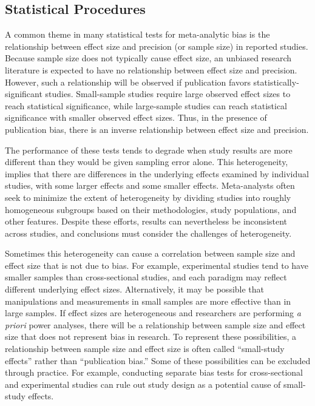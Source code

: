 \documentclass[man, mask]{apa6}
\begin{document}
\subsection{Statistical Procedures}
A common theme in many statistical tests for meta-analytic bias is the relationship between effect size and precision (or sample size) in reported studies. Because sample size does not typically cause effect size, an unbiased research literature is expected to have no relationship between effect size and precision. However, such a relationship will be observed if publication favors statistically-significant studies. Small-sample studies require large observed effect sizes to reach statistical significance, while large-sample studies can reach statistical significance with smaller observed effect sizes. Thus, in the presence of publication bias, there is an inverse relationship between effect size and precision. 

The performance of these tests tends to degrade when study results are more different than they would be given sampling error alone. This heterogeneity, implies that there are differences in the underlying effects examined by individual studies, with some larger effects and some smaller effects. Meta-analysts often seek to minimize the extent of heterogeneity by dividing studies into roughly homogeneous subgroups based on their methodologies, study populations, and other features. Despite these efforts, results can nevertheless be inconsistent across studies, and conclusions must consider the challenges of heterogeneity.

Sometimes this heterogeneity can cause a correlation between sample size and effect size that is not due to bias. For example, experimental studies tend to have smaller samples than cross-sectional studies, and each paradigm may reflect different underlying effect sizes. Alternatively, it may be possible that manipulations and measurements in small samples are more effective than in large samples. If effect sizes are heterogeneous and researchers are performing {\em a priori} power analyses, there will be a relationship between sample size and effect size that does not represent bias in research.
To represent these possibilities, a relationship between sample size and effect size is often called ``small-study effects'' rather than ``publication bias.'' Some of these possibilities can be excluded through practice. For example, conducting separate bias tests for cross-sectional and experimental studies can rule out study design as a potential cause of small-study effects.
\end{document}
